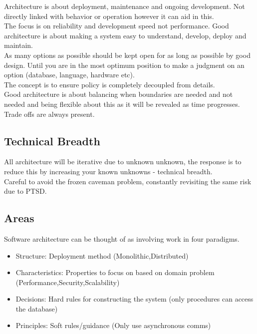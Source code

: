 \documentclass[11pt]{scrartcl} %
\begin{document}
Architecture is about deployment, maintenance and ongoing development.
Not directly linked with behavior or operation however it can aid in
this.\\

The focus is on reliability and development speed not performance. Good architecture is about
making a system easy to understand, develop, deploy and maintain.\\

As many options as possible should be kept open for as long as possible
by good design. Until you are in the most optimum position to make a
judgment on an option (database, language, hardware etc).\\

The concept is to ensure policy is completely decoupled from details.\\

Good architecture is about balancing when boundaries are needed and not needed and being flexible 
about this as it will be revealed as time progresses. Trade offs are always present.

\subsection{Technical Breadth}

All architecture will be iterative due to unknown unknown, the response is to reduce this by increasing
your known unknowns - technical breadth.\\

Careful to avoid the frozen caveman problem, constantly revisiting the same risk due to PTSD.

\subsection{Areas}

Software architecture can be thought of as involving work in four paradigms.

\begin{itemize}
  \item Structure: Deployment method (Monolithic,Distributed)
  \item Characteristics: Properties to focus on based on domain problem (Performance,Security,Scalability)
  \item Decisions: Hard rules for constructing the system (only procedures can access the database)
  \item Principles: Soft rules/guidance (Only use asynchronous comms)
\end{itemize}
\end{document}
